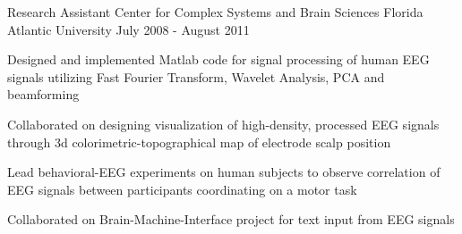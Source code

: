 \begin{cventries}
\cventry
{Research Assistant} %
{Center for Complex Systems and Brain Sciences} %
{Florida Atlantic University} %
{July 2008 - August 2011} %
{ %
\begin{cvitems}
\item {Designed and implemented Matlab code for signal processing of human EEG signals utilizing Fast Fourier Transform, Wavelet Analysis, PCA and beamforming}
\item {Collaborated on designing visualization of high-density, processed EEG signals through 3d colorimetric-topographical map of electrode scalp position}
\item {Lead behavioral-EEG experiments on human subjects to observe correlation of EEG signals between participants coordinating on a motor task}
\item {Collaborated on Brain-Machine-Interface project for text input from EEG signals}
\end{cvitems}
}





\end{cventries}
